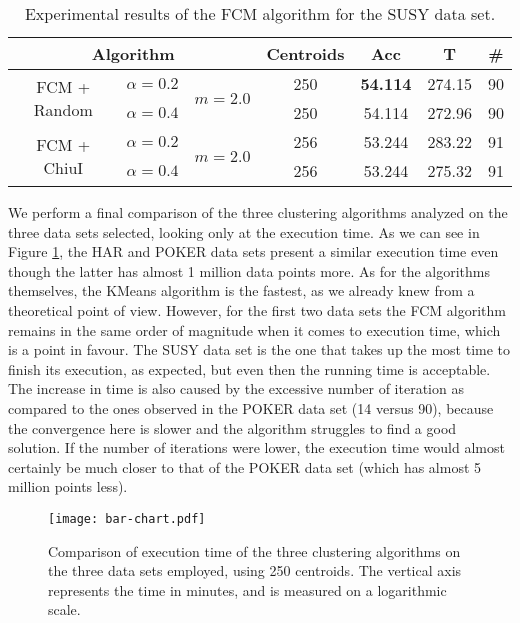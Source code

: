 \begin{table}[h!]
\centering
\caption{Experimental results of the FCM algorithm for the SUSY data set.}
\label{tab:susy2}
\begin{tabular}{ccccccc}
\toprule
\multicolumn{3}{c}{Algorithm} & Centroids & Acc & T & \#\\ \midrule
 \multirow{2}{*}{FCM + Random} & $\alpha = 0.2$ & \multirow{2}{*}{$m=2.0$} & 250 & \textbf{54.114} & 274.15 & 90\\
& $\alpha=0.4$ &  & 250 & 54.114 & 272.96 & 90\\
\multirow{2}{*}{FCM + ChiuI} & $\alpha = 0.2$ & \multirow{2}{*}{$m=2.0$} & 256 & 53.244 & 283.22 & 91\\
& $\alpha=0.4$ &  & 256 & 53.244 & 275.32 & 91\\ \bottomrule
\end{tabular}
\end{table}

We perform a final comparison of the three clustering algorithms analyzed on the three data sets selected, looking only at the execution time. As we can see in Figure \ref{fig:bar-chart}, the HAR and POKER data sets present a similar execution time even though the latter has almost 1 million data points more. As for the algorithms themselves, the KMeans algorithm is the fastest, as we already knew from a theoretical point of view. However, for the first two data sets the FCM algorithm remains in the same order of magnitude when it comes to execution time, which is a point in favour. The SUSY data set is the one that takes up the most time to finish its execution, as expected, but even then the running time is acceptable. The increase in time is also caused by the excessive number of iteration as compared to the ones observed in the POKER data set (14 versus 90), because the convergence here is slower and the algorithm struggles to find a good solution. If the number of iterations were lower, the execution time would almost certainly be much closer to that of the POKER data set (which has almost 5 million points less).

\begin{figure}[h!]
\centering
\texttt{[image: bar-chart.pdf]}
\caption{Comparison of execution time of the three clustering algorithms on the three data sets employed, using 250 centroids. The vertical axis represents the time in minutes, and is measured on a logarithmic scale.}
\label{fig:bar-chart}
\end{figure}

